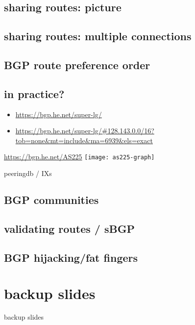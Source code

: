 \subsection{sharing routes: picture}


\subsection{sharing routes: multiple connections}


\subsection{BGP route preference order}

\subsection{in practice?}
\begin{frame}[fragile]{}
    \begin{itemize}
    \item \url{https://bgp.he.net/super-lg/}
    \item \url{https://bgp.he.net/super-lg/#128.143.0.0/16?tob=none&mt=include&ma=6939&els=exact}
    \end{itemize}
\end{frame}

\begin{frame}{}
\url{https://bgp.he.net/AS225}
\texttt{[image: as225-graph]}
\end{frame}

\begin{frame}{peeringdb / IXs}
\end{frame}

\subsection{BGP communities}


\subsection{validating routes / sBGP}


\subsection{BGP hijacking/fat fingers}




\section{backup slides}
\begin{frame}{backup slides}
\end{frame}


